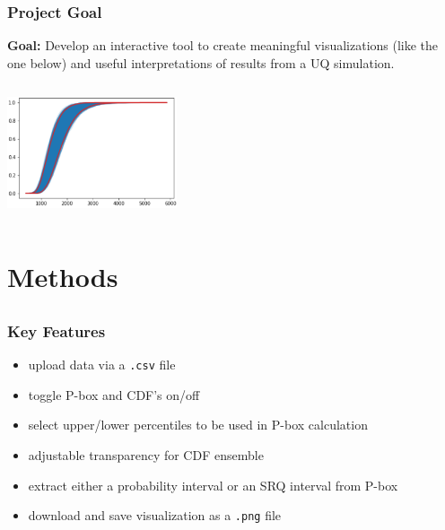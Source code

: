 \documentclass[handout, xcolor=dvipsnames]{beamer}
\begin{document}
\begin{frame}
	\frametitle{Project Goal}
	\textbf{Goal:} Develop an interactive tool to create meaningful visualizations (like the one below) and useful interpretations of results from a UQ simulation.\\
	\begin{center}
	\begin{center} 
	\includegraphics[height=4cm,width=5cm]{figures/viz_exmp.png}
	\end{center}	
	\end{center}
\end{frame}

\section{Methods}  

\subsection{}
\begin{frame}
	\frametitle{Key Features}
		\begin{itemize}
		\setlength\itemsep{1.5em}
		\item upload data via a {\tt .csv} file
		\item toggle P-box and CDF's on/off
		\item select upper/lower percentiles to be used in P-box calculation
		\item adjustable transparency for CDF ensemble
		\item extract either a probability interval or an SRQ interval from P-box
		\item download and save visualization as a {\tt .png} file
    \end{itemize}
\end{frame}
\end{document}
